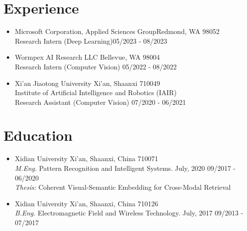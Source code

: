 \documentclass[10pt,margin,line,pifont,palatino,courier]{res}
\begin{document}
\begin{resume}
\section{\sc Experience}

\begin{itemize}[leftmargin=*]
	\item Microsoft Corporation, Applied Sciences Group\hfill Redmond, WA 98052\\
        Research Intern (Deep Learning)\hfill 05/2023 - 08/2023
    \item Wormpex AI Research LLC \hfill Bellevue, WA 98004\\
        Research Intern (Computer Vision) \hfill 05/2022 - 08/2022
	\item Xi'an Jiaotong University \hfill Xi'an, Shaanxi 710049\\
        Institute of Artificial Intelligence and Robotics (IAIR) \\
        Research Assistant (Computer Vision) \hfill 07/2020 - 06/2021 
\end{itemize}

\section{\sc Education}

\begin{itemize}[leftmargin=*]
\item Xidian University \hfill Xi'an, Shaanxi, China 710071\\
	\textit{M.Eng.} Pattern Recognition and Intelligent Systems. July, 2020 \hfill 09/2017 - 06/2020\\
	\textit{Thesis:} Coherent Visual-Semantic Embedding for Cross-Modal Retrieval
\item Xidian University \hfill Xi'an, Shaanxi, China 710126\\
	\textit{B.Eng.} Electromagnetic Field and Wireless Technology. July, 2017 \hfill 09/2013 - 07/2017
\end{itemize}


\end{resume}
\end{document}
